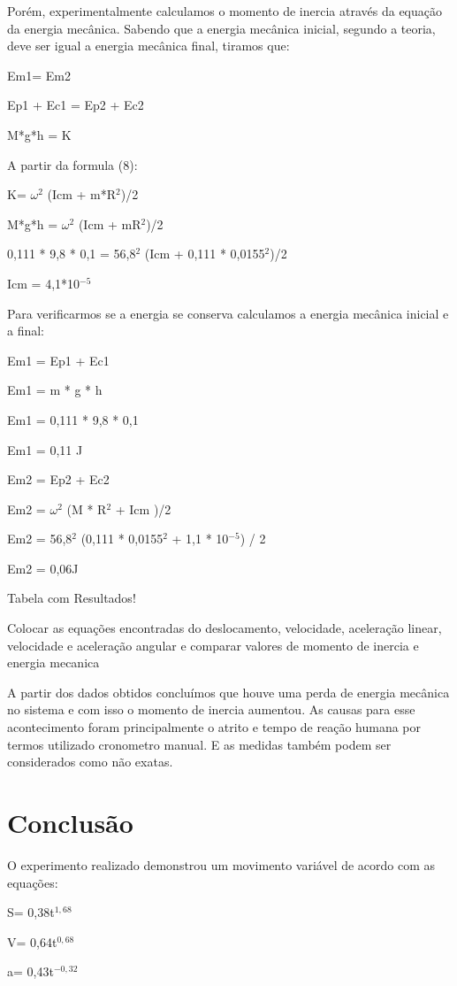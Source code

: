 \documentclass[
	12pt,				%
	oneside,			%
	a4paper,			%
	english,			%
	french,				%
	spanish,			%
	brazil,				%
	]{abntex2}
\begin{document}
Porém, experimentalmente calculamos o momento de inercia através da equação da energia mecânica. Sabendo que a energia mecânica inicial, segundo a teoria, deve ser igual a energia mecânica final, tiramos que:

Em1= Em2

Ep1 + Ec1 = Ep2 + Ec2

M*g*h = K

A partir da formula (8):

K= $\omega^{2}$ (Icm + m*R$^{2}$)/2

M*g*h = $\omega^{2}$ (Icm + mR$^{2}$)/2

0,111 * 9,8 * 0,1 = 56,8$^{2}$ (Icm + 0,111 * 0,0155$^{2}$)/2

Icm = 4,1*10$^{-5}$

Para verificarmos se a energia se conserva calculamos a energia mecânica inicial e a final:

Em1 = Ep1 + Ec1

Em1 = m * g * h

Em1 = 0,111 * 9,8 * 0,1

Em1 = 0,11 J

Em2 = Ep2 + Ec2

Em2 = $\omega^{2}$ (M * R$^{2}$ + Icm )/2

Em2 = 56,8$^{2}$ (0,111 * 0,0155$^{2}$ + 1,1 * 10$^{-5}$) / 2

Em2 = 0,06J

Tabela com Resultados!

Colocar as equações encontradas do deslocamento, velocidade, aceleração linear, velocidade e aceleração angular e comparar valores de momento de inercia e energia mecanica

A partir dos dados obtidos concluímos que houve uma perda de energia mecânica no sistema e com isso o momento de inercia aumentou. As causas para esse acontecimento foram principalmente o atrito e tempo de reação humana por termos utilizado cronometro manual. E as medidas também podem ser considerados como não exatas.
\newpage
\section[Conclusão]{Conclusão}
\pagestyle{fancy}%
O experimento realizado demonstrou um movimento variável de acordo com as equações:

S= 0,38t$^{1,68}$ 

V= 0,64t$^{0,68}$

a= 0,43t$^{-0,32}$
\end{document}
